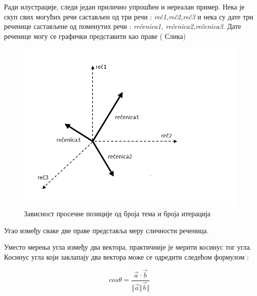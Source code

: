 Ради илустрације, следи један прилично упрошћен и нереалан пример. 
Нека је скуп свих могућих речи састављен од три речи : \textit{reč1,reč2,reč3} и нека су дате три реченице састављене од поменутих речи : \textit{rečenica1, rečenica2,rečenica3}. 
Дате реченице могу се графички представити као праве ( Слика)

\begin{figure}[H]
    \centering
   \includegraphics[scale=0.3]{./Slike/kosinusna.png} 
	\caption{Зависност просечне позиције од броја тема и броја итерација}
	\label{fig:slika1}
\end{figure}

Угао између сваке две праве представља меру сличности реченица.

Уместо мерења угла између два вектора, практичније је мерити косинус тог угла. 
Косинус угла који заклапају два вектора може се одредити следећом формулом :


$$ cos\theta = \frac{\overrightarrow{a}\cdot \overrightarrow{b}}{\Vert\overrightarrow{a}\Vert\overrightarrow{b}\Vert} $$




